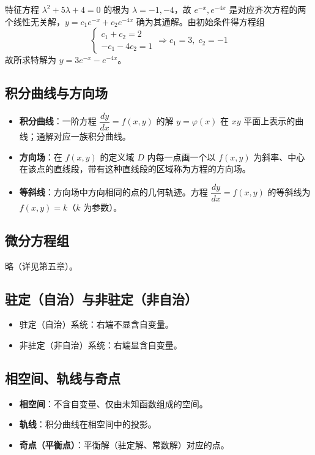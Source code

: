 \begin{solution}
特征方程 $\lambda^2 + 5\lambda + 4 = 0$ 的根为 $\lambda = -1, -4$，故 $e^{-x}, e^{-4x}$ 是对应齐次方程的两个线性无关解，$y = c_1 e^{-x} + c_2 e^{-4x}$ 确为其通解。由初始条件得方程组
$$\begin{cases} c_1 + c_2 = 2 \\ -c_1 - 4c_2 = 1 \end{cases} \Rightarrow c_1 = 3, \; c_2 = -1$$
故所求特解为 $y = 3e^{-x} - e^{-4x}$。
\end{solution}

\subsection{积分曲线与方向场}

\begin{itemize}
    \item \textbf{积分曲线}：一阶方程 $\dfrac{dy}{dx} = f(x, y)$ 的解 $y = \varphi(x)$ 在 $xy$ 平面上表示的曲线；通解对应一族积分曲线。
    \item \textbf{方向场}：在 $f(x, y)$ 的定义域 $D$ 内每一点画一个以 $f(x, y)$ 为斜率、中心在该点的直线段，带有这种直线段的区域称为方程的方向场。
    \item \textbf{等斜线}：方向场中方向相同的点的几何轨迹。方程 $\dfrac{dy}{dx} = f(x, y)$ 的等斜线为 $f(x, y) = k$（$k$ 为参数）。
\end{itemize}

\subsection{微分方程组}

略（详见第五章）。

\subsection{驻定（自治）与非驻定（非自治）}

\begin{itemize}
    \item 驻定（自治）系统：右端不显含自变量。
    \item 非驻定（非自治）系统：右端显含自变量。
\end{itemize}

\subsection{相空间、轨线与奇点}

\begin{itemize}
    \item \textbf{相空间}：不含自变量、仅由未知函数组成的空间。
    \item \textbf{轨线}：积分曲线在相空间中的投影。
    \item \textbf{奇点（平衡点）}：平衡解（驻定解、常数解）对应的点。
\end{itemize}

